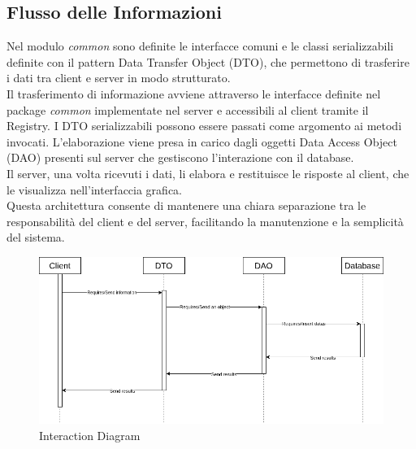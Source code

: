 \subsection{Flusso delle Informazioni}
Nel modulo \textit{common} sono definite le interfacce comuni e le 
classi serializzabili definite con il pattern 
Data Transfer Object (DTO), che permettono di trasferire
i dati tra client e server in modo strutturato.\\
Il trasferimento di informazione avviene attraverso le interfacce 
definite nel package \textit{common} implementate nel server e 
accessibili al client tramite il Registry.
I DTO serializzabili possono essere passati come argomento ai 
metodi invocati.
L'elaborazione viene presa 
in carico dagli oggetti Data Access Object (DAO) 
presenti sul server che
gestiscono l'interazione con il database.\\
Il server, una volta ricevuti i dati, li elabora e restituisce
le risposte al client, che le visualizza nell'interfaccia grafica.\\
Questa architettura consente di mantenere una chiara separazione
tra le responsabilità del client e del server, facilitando la
manutenzione e la semplicità del sistema.

\begin{figure}[H]
  \centering
  \includegraphics[width=\textwidth]{images/UML-interaction.png}
  \caption{Interaction Diagram}
  \label{fig:interaction-diagram}
\end{figure}
